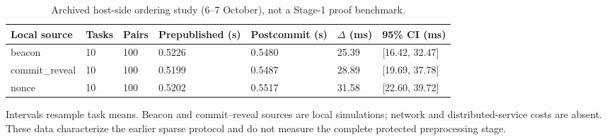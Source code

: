 \begin{table}[!htbp]
\caption{Archived host-side ordering study (6--7 October), not a Stage-1 proof benchmark.}\label{tab:ordering-a}
\centering\scriptsize
\begin{adjustbox}{max width=\textwidth}
\begin{tabular}{@{}lllllll@{}}
\toprule
Local source & Tasks & Pairs & Prepublished (s) & Postcommit (s) & $\Delta$ (ms) & 95\% CI (ms) \\
\midrule
beacon & 10 & 100 & 0.5226 & 0.5480 & 25.39 & [16.42, 32.47] \\
commit\_reveal & 10 & 100 & 0.5199 & 0.5487 & 28.89 & [19.69, 37.78] \\
nonce & 10 & 100 & 0.5202 & 0.5517 & 31.58 & [22.60, 39.72] \\
\bottomrule
\end{tabular}
\end{adjustbox}
\par\smallskip
\begin{minipage}{\textwidth}\scriptsize Intervals resample task means. Beacon and commit--reveal sources are local simulations; network and distributed-service costs are absent. These data characterize the earlier sparse protocol and do not measure the complete protected preprocessing stage.\end{minipage}
\end{table}
